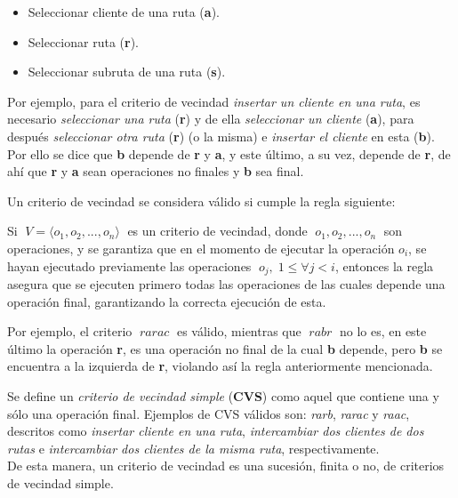 \documentclass[a4paper,10pt,twocolumn]{article}
\begin{document}
	\begin{itemize}
		\item Seleccionar cliente de una ruta (\textbf{a}).
		\item Seleccionar ruta (\textbf{r}).
		\item Seleccionar subruta de una ruta (\textbf{s}).
	\end{itemize}

	Por ejemplo, para el criterio de vecindad \textit{insertar un cliente en una ruta},
	es necesario \textit{seleccionar una ruta} (\textbf{r}) y de ella \textit{seleccionar 
	un cliente} (\textbf{a}), para después \textit{seleccionar otra ruta} (\textbf{r}) 
	(o la misma) e \textit{insertar el cliente} en esta (\textbf{b}). Por ello se dice que 
	\textbf{b} depende de \textbf{r} y \textbf{a}, y este último, a su vez, depende de 
	\textbf{r}, de ahí que \textbf{r} y \textbf{a} sean operaciones no finales y \textbf{b} 
	sea final.
	
	Un criterio de vecindad se considera válido si cumple la regla siguiente:
	
	\begin{center}
	\end{center}
	
	Si $\; V = \langle o_1, o_2, ..., o_n \rangle \;$ es un criterio de vecindad, donde
	$\; o_1, o_2, ..., o_n \;$ son operaciones, y se garantiza que en el momento de 
	ejecutar la operación $ o_i $, se hayan ejecutado previamente las operaciones 
	$\; o_j,\; 1 \leq \forall j < i $, entonces la regla asegura que se ejecuten 
	primero todas las operaciones de las cuales depende una operación final, 
	garantizando la correcta ejecución de esta.

	Por ejemplo, el criterio $\;rarac\;$ es válido, mientras que $\;rabr\;$ no lo es, 
	en este último la operación \textbf{r}, es una operación no final de la cual \textbf{b} 
	depende, pero \textbf{b} se encuentra a la izquierda de \textbf{r}, violando así la 
	regla anteriormente mencionada.

	Se define un \textit{criterio de vecindad simple} (\textbf{CVS}) como aquel que 
	contiene una y sólo una operación final. Ejemplos de CVS válidos son:
	\textit{rarb}, \textit{rarac} y \textit{raac}, descritos como \textit{insertar 
	cliente en una ruta}, \textit{intercambiar dos clientes de dos rutas} e
	\textit{intercambiar dos clientes de la misma ruta}, respectivamente.\\
	De esta manera, un criterio de vecindad es una sucesión, finita o no, de criterios 
	de vecindad simple.
\end{document}
